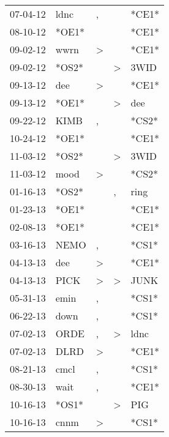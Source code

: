 \begin{supertabular}{lllll}
 07-04-12 &   ldnc &                , &                  &  *CE1* \\
 08-10-12 &  *OE1* &                  &                  &  *CE1* \\
 09-02-12 &   wwrn &     \textgreater &                  &  *CE1* \\
 09-02-12 &  *OS2* &                  &     \textgreater &   3WID \\
 09-13-12 &    dee &     \textgreater &                  &  *CE1* \\
 09-13-12 &  *OE1* &                  &     \textgreater &    dee \\
 09-22-12 &   KIMB &                , &                  &  *CS2* \\
 10-24-12 &  *OE1* &                  &                  &  *CE1* \\
 11-03-12 &  *OS2* &                  &     \textgreater &   3WID \\
 11-03-12 &   mood &     \textgreater &                  &  *CS2* \\
 01-16-13 &  *OS2* &                  &                , &   ring \\
 01-23-13 &  *OE1* &                  &                  &  *CE1* \\
 02-08-13 &  *OE1* &                  &                  &  *CE1* \\
 03-16-13 &   NEMO &                , &                  &  *CS1* \\
 04-13-13 &    dee &     \textgreater &                  &  *CE1* \\
 04-13-13 &   PICK &     \textgreater &     \textgreater &   JUNK \\
 05-31-13 &   emin &                , &                  &  *CS1* \\
 06-22-13 &   down &                , &                  &  *CS1* \\
 07-02-13 &   ORDE &                , &     \textgreater &   ldnc \\
 07-02-13 &   DLRD &     \textgreater &                  &  *CE1* \\
 08-21-13 &   cmcl &                , &                  &  *CS1* \\
 08-30-13 &   wait &                , &                  &  *CE1* \\
 10-16-13 &  *OS1* &                  &     \textgreater &    PIG \\
 10-16-13 &   cnnm &     \textgreater &                  &  *CS1* \\

\end{supertabular}
